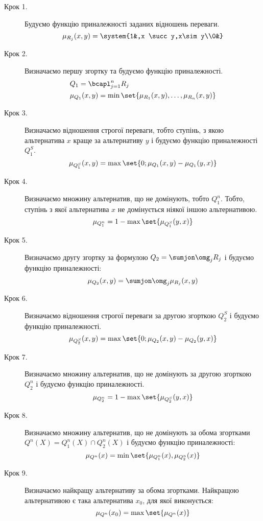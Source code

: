 \begin{description}
\item[Крок 1.] Будуємо функцію приналежності заданих відношень переваги.
\begin{equation}
\mu_{R_j} (x,y) = \system{1&,x \succ y,x\sim y\\0&}
\end{equation}
\item[Крок 2.] Визначаємо першу згортку та будуємо функцію приналежності.
\begin{eqnarray}
&Q_1=\bcapl_{j=1}^n R_j\\
&\mu_{Q_1}(x,y) = \min\set{\mu_{R_1}(x,y),\ldots,\mu_{R_n}(x,y)}
\end{eqnarray}
\item[Крок 3.]  Визначаємо відношення строгої переваги, тобто ступінь, з якою альтернатива $x$ краще за альтернативу $y$ і будуємо функцію приналежності $Q_1^S$.
\begin{equation}
\mu_{Q_1^S}(x,y) = \max\set{0;\mu_{Q_1}(x,y)-\mu_{Q_1}(y,x)}
\end{equation}
\item[Крок 4.]  Визначаємо множину альтернатив, що не домінують, тобто $Q_1^n$. Тобто, ступінь з якої альтернатива $x$ не домінується ніякої іншою альтернативою.
\begin{equation}
\mu_{Q_1^n} = 1 - \max\set{\mu_{Q_1^S}(y,x)}
\end{equation}
\item[Крок 5.]  Визначаємо другу згортку за формулою $Q_2=\sumjon \omg_j R_j$ і будуємо функцію приналежності: 
\begin{equation}
\mu_{Q_2}(x,y) = \sumjon \omg_j \mu_{R_j}(x,y)
\end{equation}
\item[Крок 6.]  Визначаємо відношення строгої переваги за другою згорткою $Q_2^S$ і будуємо функцію приналежності.
\begin{equation}
\mu_{Q_2^S}(x,y) = \max\set{0;\mu_{Q_2}(x,y)-\mu_{Q_2}(y,x)}
\end{equation}
\item[Крок 7.]  Визначаємо множину альтернатив, що не домінують за другою згорткою $Q_2^n$ і будуємо функцію приналежності.
\begin{equation}
\mu_{Q_2^n} = 1 - \max\set{\mu_{Q_2^S}(y,x)}
\end{equation}
\item[Крок 8.]  Визначаємо множину альтернатив, що не домінують за обома згортками $Q^n(X) = Q_1^n(X) \cap Q_2^n(X)$ і будуємо функцію приналежності:
\begin{equation}
\mu_{Q^n}(x) = \min\set{\mu_{Q_1^n}(x),\mu_{Q_2^n}(x)}
\end{equation}
\item[Крок 9.]  Визначаємо найкращу альтернативу за обома згортками. Найкращою альтернативою є така альтернатива $x_0$, для якої виконується:
\begin{equation}
\mu_{Q^n}(x_0) = \max\set{\mu_{Q^n}(x)}
\end{equation}
\end{description}
